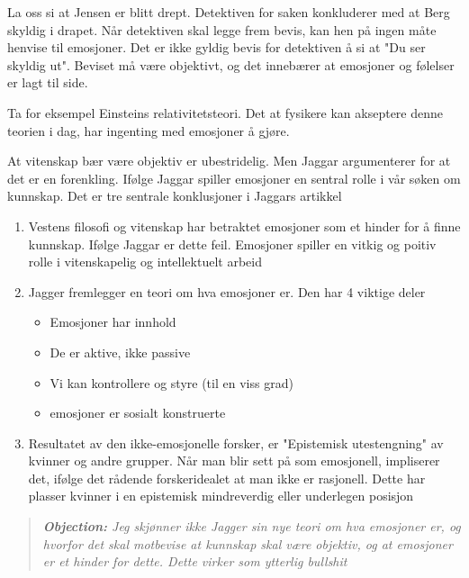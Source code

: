\documentclass[11pt, a4paper]{article}
\newenvironment{objection}{\begin{quote}\itshape\textbf{Objection: }}{\end{quote}} %
\begin{document}
\vspace{1em}


La oss si at Jensen er blitt drept. Detektiven for saken konkluderer med at Berg skyldig i drapet. 
Når detektiven skal legge frem bevis, kan hen på ingen måte henvise til emosjoner. 
Det er ikke gyldig bevis for detektiven å si at "Du ser skyldig ut". Beviset må være objektivt, og det innebærer at emosjoner og følelser er lagt til side.


Ta for eksempel Einsteins relativitetsteori. Det at fysikere kan akseptere denne teorien i dag, har ingenting med emosjoner å gjøre.




\vspace{1em}

At vitenskap bær være objektiv er ubestridelig. Men Jaggar argumenterer for at det er en forenkling.
Ifølge Jaggar spiller emosjoner en sentral rolle i vår søken om kunnskap. Det er tre sentrale konklusjoner i Jaggars artikkel
\begin{enumerate}
    \item Vestens filosofi og vitenskap har betraktet emosjoner som et hinder for å finne kunnskap. Ifølge Jaggar er dette feil. Emosjoner spiller en vitkig og poitiv rolle i vitenskapelig og intellektuelt arbeid
    \item Jagger fremlegger en teori om hva emosjoner er. Den har 4 viktige deler
    \begin{itemize}
        \item Emosjoner har innhold
        \item De er aktive, ikke passive
        \item Vi kan kontrollere og styre (til en viss grad)
        \item emosjoner er sosialt konstruerte
    \end{itemize}
    \item Resultatet av den ikke-emosjonelle forsker, er "Epistemisk utestengning" av kvinner og andre grupper. Når man blir sett på som emosjonell, impliserer det, ifølge det rådende forskeridealet at man ikke er rasjonell. Dette har plasser kvinner i en epistemisk mindreverdig eller underlegen posisjon 

\end{enumerate}



\begin{objection}
    Jeg skjønner ikke Jagger sin nye teori om hva emosjoner er, og hvorfor det skal motbevise at kunnskap skal være objektiv, og at emosjoner er et hinder for dette. Dette virker som ytterlig bullshit
\end{objection}
\end{document}
